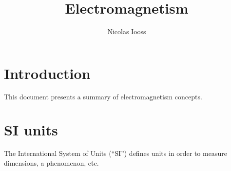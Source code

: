 \documentclass[a4paper,10pt]{article}
\title{Electromagnetism}
\author{Nicolas Iooss}
\begin{document}
\maketitle

\section*{Introduction}

This document presents a summary of electromagnetism concepts.

\section{SI units}

The International System of Units (``SI'') defines units in order to measure dimensions, a phenomenon, etc.
\end{document}
